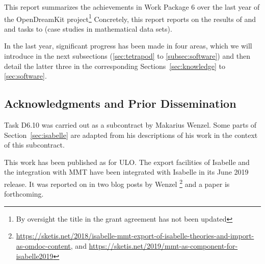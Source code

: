 This report summarizes the achievements in Work Package 6 over the last year of the OpenDreamKit project\footnote{By oversight the title in the grant agreement has not been updated} Concretely, this report reports on the results of  and  and tasks  to  (case studies in mathematical data sets).

In the last year, significant progress has been made in four areas, which we will introduce in the next subsections (\ref{sec:tetrapod} to \ref{subsec:software}) and then detail the latter three in the corresponding Sections~\ref{sec:knowledge} to \ref{sec:software}.






\subsection{Acknowledgments and Prior Dissemination}
Task D6.10  was carried out as a subcontract by Makarius Wenzel.
Some parts of Section~\ref{sec:isabelle} are adapted from his descriptions of his work in the context of this subcontract.

This work has been published as  for ULO.
The export facilities of Isabelle and the integration with MMT have been integrated with Isabelle in its June 2019 release.
It was reported on in two blog posts by Wenzel%
\footnote{\url{https://sketis.net/2018/isabelle-mmt-export-of-isabelle-theories-and-import-as-omdoc-content}, and \url{https://sketis.net/2019/mmt-as-component-for-isabelle2019}}
and a paper is forthcoming.


